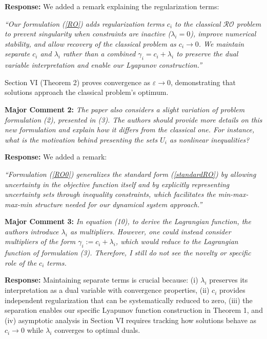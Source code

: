 \documentclass[journal,twoside,web]{ieeecolor}
\begin{document}
\noindent\textbf{Response:} We added a remark explaining the regularization terms:

{\color{revisionblue}\textit{``Our formulation (\ref{RO}) adds regularization terms $c_i$ to the classical $\mathcal{RO}$ problem to prevent singularity when constraints are inactive ($\lambda_i = 0$), improve numerical stability, and allow recovery of the classical problem as $c_i \to 0$. We maintain separate $c_i$ and $\lambda_i$ rather than a combined $\gamma_i = c_i + \lambda_i$ to preserve the dual variable interpretation and enable our Lyapunov construction.''}}

Section VI (Theorem 2) proves convergence as $\varepsilon \to 0$, demonstrating that solutions approach the classical problem's optimum.

\vspace{0.5em}
\noindent\textbf{Major Comment 2:} \textit{The paper also considers a slight variation of problem formulation (2), presented in (3). The authors should provide more details on this new formulation and explain how it differs from the classical one. For instance, what is the motivation behind presenting the sets $U_i$ as nonlinear inequalities?}

\noindent\textbf{Response:} We added a remark:

{\color{revisionblue}\textit{``Formulation (\ref{RO0}) generalizes the standard form (\ref{standardRO}) by allowing uncertainty in the objective function itself and by explicitly representing uncertainty sets through inequality constraints, which facilitates the min-max-max-min structure needed for our dynamical system approach.''}}

\vspace{0.5em}
\noindent\textbf{Major Comment 3:} \textit{In equation (10), to derive the Lagrangian function, the authors introduce $\lambda_i$ as multipliers. However, one could instead consider multipliers of the form $\gamma_i := c_i + \lambda_i$, which would reduce to the Lagrangian function of formulation (3). Therefore, I still do not see the novelty or specific role of the $c_i$ terms.}

\noindent\textbf{Response:} Maintaining separate terms is crucial because: (i) $\lambda_i$ preserves its interpretation as a dual variable with convergence properties, (ii) $c_i$ provides independent regularization that can be systematically reduced to zero, (iii) the separation enables our specific Lyapunov function construction in Theorem 1, and (iv) asymptotic analysis in Section VI requires tracking how solutions behave as $c_i \to 0$ while $\lambda_i$ converges to optimal duals.
\end{document}
